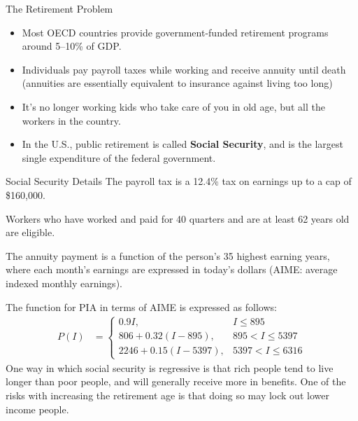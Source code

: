 \documentclass[10pt]{extarticle}
\begin{document}
\begin{problem}{The Retirement Problem}
\begin{itemize}
      \item Most OECD countries provide government-funded retirement programs around 5--10\% of GDP.
      \item Individuals pay payroll taxes while working and receive annuity until death (annuities are essentially equivalent to insurance against living too long) 
      \item It's no longer working kids who take care of you in old age, but all the workers in the country.
      \item In the U.S., public retirement is called \textbf{Social Security}, and is the largest single expenditure of the federal government.
    \end{itemize}
  \end{problem}
  \begin{problem}{Social Security Details}
    The payroll tax is a 12.4\% tax on earnings up to a cap of \$160,000.\newline

    Workers who have worked and paid for 40 quarters and are at least 62 years old are eligible.\newline

    The annuity payment is a function of the person's 35 highest earning years, where each month's earnings are expressed in today's dollars (AIME: average indexed monthly earnings).\newline

    The function for PIA in terms of AIME is expressed as follows:
    \begin{align*}
      P(I) &= \begin{cases}
        0.9I,& I \leq 895\\
        806 + 0.32(I - 895),& 895 < I \leq 5397\\
        2246 + 0.15(I - 5397),& 5397 < I \leq 6316
      \end{cases}
    \end{align*}
    One way in which social security is regressive is that rich people tend to live longer than poor people, and will generally receive more in benefits. One of the risks with increasing the retirement age is that doing so may lock out lower income people.\newline


\end{problem}
\end{document}
